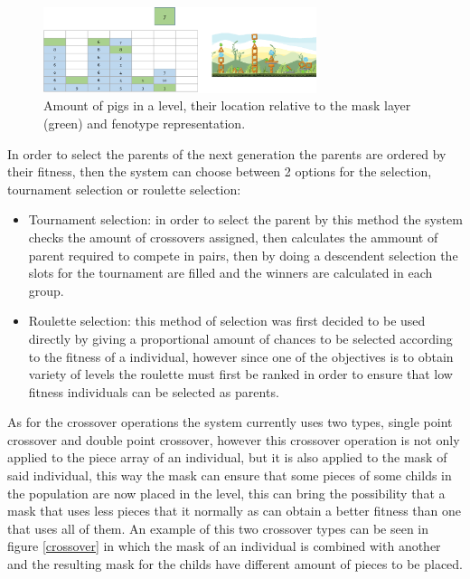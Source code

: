 \documentclass[conference]{IEEEtran}
\begin{document}
\begin{figure}[htbp]
    \centerline{\includegraphics[width=80mm]{Images/enemy_layer.png}}
    \caption{Amount of pigs in a level, their location relative to the mask layer (green) and fenotype representation.}
    \label{enemy_layer}
\end{figure}

In order to select the parents of the next generation the parents are ordered by
their fitness, then the system can choose between 2 options for the selection,
tournament selection or roulette selection:

\begin{itemize}
    \item Tournament selection: in order to select the parent by this method the
    system checks the amount of crossovers assigned, then calculates the ammount
    of parent required to compete in pairs, then by doing a descendent selection
    the slots for the tournament are filled and the winners are calculated in
    each group.
    \item Roulette selection: this method of selection was first decided to be
    used directly by giving a proportional amount of chances to be selected
    according to the fitness of a individual, however since one of the
    objectives is to obtain variety of levels the roulette must first be ranked
    in order to ensure that low fitness individuals can be selected as parents.
\end{itemize}

As for the crossover operations the system currently uses two types, single
point crossover and double point crossover, however this crossover operation is
not only applied to the piece array of an individual, but it is also applied to
the mask of said individual, this way the mask can ensure that some pieces of
some childs in the population are now placed in the level, this can bring the
possibility that a mask that uses less pieces that it normally as can obtain a
better fitness than one that uses all of them. An example of this two crossover
types can be seen in figure \ref{crossover} in which the mask of an individual
is combined with another and the resulting mask for the childs have different
amount of pieces to be placed.
\end{document}
